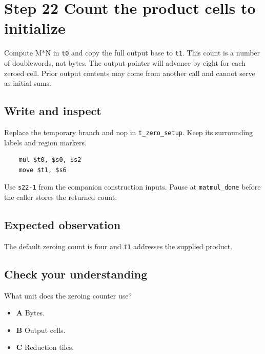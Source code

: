 \section{Step 22 Count the product cells to initialize}\label{matmul-s22}

Compute M*N in \texttt{t0} and copy the full output base to \texttt{t1}. This count is a number of doublewords, not bytes. The output pointer will advance by eight for each zeroed cell. Prior output contents may come from another call and cannot serve as initial sums.

\subsection{Write and inspect}
Replace the temporary branch and nop in \texttt{t\_zero\_setup}. Keep its surrounding labels and region markers.

\begin{verbatim}
    mul $t0, $s0, $s2
    move $t1, $s6
\end{verbatim}
Use \texttt{s22-1} from the companion construction inputs. Pause at \texttt{matmul\_done} before the caller stores the returned count.

\subsection{Expected observation}
The default zeroing count is four and \texttt{t1} addresses the supplied product.

\subsection{Check your understanding}
What unit does the zeroing counter use?

\begin{itemize}
  \item \textbf{A} Bytes.
  \item \textbf{B} Output cells.
  \item \textbf{C} Reduction tiles.
\end{itemize}
